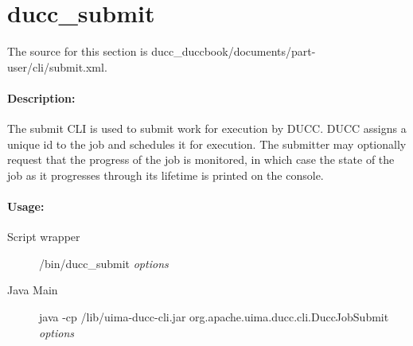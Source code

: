 \ifpdf
\else
{}
\fi

    \section{ducc\_submit}
    \label{sec:cli.ducc-submit}
       The source for this section is ducc\_duccbook/documents/part-user/cli/submit.xml.
       \paragraph{Description:}
           The submit CLI is used to submit work for execution by DUCC. DUCC assigns a unique id to the
           job and schedules it for execution. The submitter may optionally request that the progress of
           the job is monitored, in which case the state of the job as it progresses through its
           lifetime is printed on the console.
       \paragraph{Usage:}
           \begin{description}
             \item[Script wrapper] \ducchome/bin/ducc\_submit {\em options}
             \item[Java Main]      java -cp \ducchome/lib/uima-ducc-cli.jar org.apache.uima.ducc.cli.DuccJobSubmit {\em options}
           \end{description}

